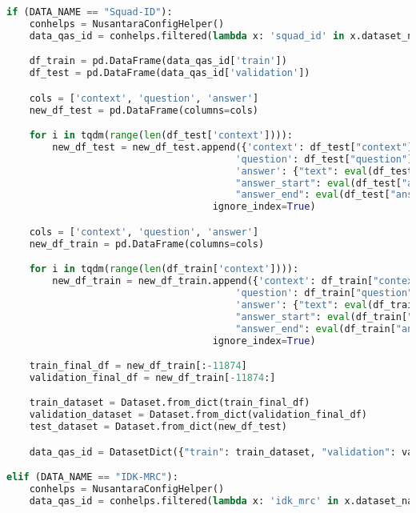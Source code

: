 \begin{lstlisting}[language=Python, caption=Mengimpor \emph{dataset} sistem tanya jawab]
if (DATA_NAME == "Squad-ID"):
    conhelps = NusantaraConfigHelper()
    data_qas_id = conhelps.filtered(lambda x: 'squad_id' in x.dataset_name)[0].load_dataset()

    df_train = pd.DataFrame(data_qas_id['train'])
    df_test = pd.DataFrame(data_qas_id['validation'])

    cols = ['context', 'question', 'answer']
    new_df_test = pd.DataFrame(columns=cols)

    for i in tqdm(range(len(df_test['context']))):
        new_df_test = new_df_test.append({'context': df_test["context"][i], 
                                        'question': df_test["question"][i], 
                                        'answer': {"text": eval(df_test["answer"][i][0])['text'], 
                                        "answer_start": eval(df_test["answer"][i][0])['answer_start'], 
                                        "answer_end": eval(df_test["answer"][i][0])['answer_end']}}, 
                                    ignore_index=True)

    cols = ['context', 'question', 'answer']
    new_df_train = pd.DataFrame(columns=cols)

    for i in tqdm(range(len(df_train['context']))):
        new_df_train = new_df_train.append({'context': df_train["context"][i], 
                                        'question': df_train["question"][i], 
                                        'answer': {"text": eval(df_train["answer"][i][0])['text'], 
                                        "answer_start": eval(df_train["answer"][i][0])['answer_start'], 
                                        "answer_end": eval(df_train["answer"][i][0])['answer_end']}}, 
                                    ignore_index=True)

    train_final_df = new_df_train[:-11874]
    validation_final_df = new_df_train[-11874:]

    train_dataset = Dataset.from_dict(train_final_df)
    validation_dataset = Dataset.from_dict(validation_final_df)
    test_dataset = Dataset.from_dict(new_df_test)

    data_qas_id = DatasetDict({"train": train_dataset, "validation": validation_dataset, "test": test_dataset})

elif (DATA_NAME == "IDK-MRC"):
    conhelps = NusantaraConfigHelper()
    data_qas_id = conhelps.filtered(lambda x: 'idk_mrc' in x.dataset_name)[0].load_dataset()


\end{lstlisting}
